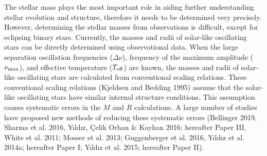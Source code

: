 \documentclass[a4paper,fleqn,usenatbib]{mnras}     %
\begin{document}
The stellar mass plays the 
most important role in aiding further
understanding stellar evolution and structure,
therefore it needs to be determined very precisely.
However, determining the stellar masses from observations
is difficult, except for eclipsing binary stars.
Currently, the masses and radii of solar-like oscillating
stars can be directly determined 
using observational data.
When the large separation oscillation frequencies ($\Delta \nu$), 
frequency of the maximum amplitude ($\nu _{\rm max}$), 
and effective temperature ($T_{\rm eff}$) are known,
the masses and radii of solar-like oscillating stars
 are calculated from conventional scaling relations. 
These conventional scaling relations (Kjeldsen and Bedding 1995) assume that
the solar-like oscillating stars have similar internal structure conditions.
This assumption causes 
systematic errors 
in the $M$ and $R$ calculations.
A large number of studies 
have proposed new methods
of reducing these 
systematic errors 
(Bellinger 2019, Sharma et al. 2016, Y{\i}ld{\i}z, \c{C}elik Orhan \& Kayhan 2016; hereafter Paper III,
White et al. 2011; Mosser et al. 2013; Guggenberger et al. 2016, Y{\i}ld{\i}z et al. 2014a; hereafter Paper I; Y{\i}ld{\i}z et al. 2015; hereafter Paper II).
\end{document}

